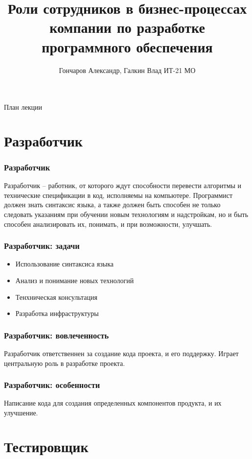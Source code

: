 \documentclass{../industrial-development}
\title{Роли сотрудников в бизнес-процессах компании по разработке программного обеспечения}
\author{Гончаров Александр, Галкин Влад ИТ-21 МО}
\date{}
\begin{document}
	
	\begin{frame}
		\titlepage
	\end{frame}
	
	\begin{frame}{План лекции}
		\tableofcontents
	\end{frame}
	
	
	\section{Разработчик }
	
	\begin{frame} \frametitle{Разработчик}
		\begin{block}{}
			\alert {}Разработчик – работник, от которого ждут способности перевести алгоритмы и технические спецификации в код, исполняемы на компьютере. Программист должен знать синтаксис языка, а также должен быть способен не только следовать указаниям при обучении новым технологиям и надстройкам, но и быть способен анализировать их, понимать, и при возможности, улучшать.
			
		\end{block}
		
	\end{frame}
	
	\begin{frame} \frametitle{Разработчик: задачи}
		\begin{itemize}
			\item Использование синтаксиса языка
			\item Анализ и понимание новых технологий
			\item Тенхническая консультация
			\item Разработка инфраструктуры
		\end{itemize}
	\end{frame}
	
	\begin{frame} \frametitle{Разработчик: вовлеченность}
		Разработчик ответственнен за создание кода проекта, и его поддержку. Играет центральную роль в разработке проекта.
	\end{frame}
	
	\begin{frame} \frametitle{Разработчик: особенности}
		Написание кода для создания определенных компонентов продукта, и их улучшение. 	
	\end{frame}
	
	\section{Тестировщик }
	
\end{document}
